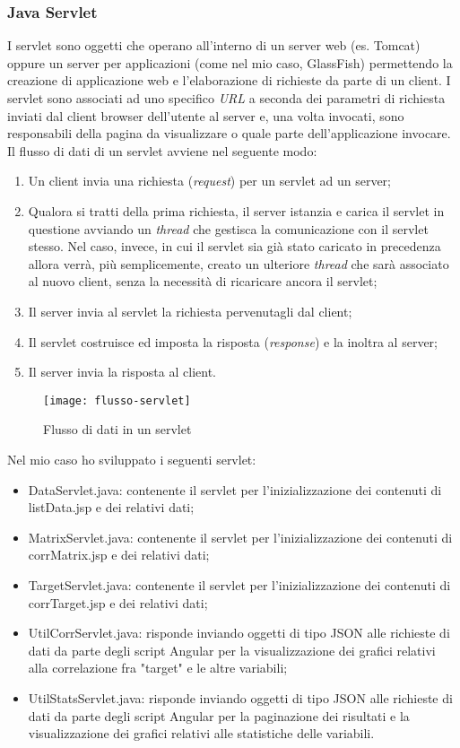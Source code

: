 \subsubsection{Java Servlet}
I servlet sono oggetti che operano all'interno di un server web (es. Tomcat) oppure un server per applicazioni (come nel mio caso, GlassFish) permettendo la creazione di applicazione web e l'elaborazione di richieste da parte di un client.
I servlet sono associati ad uno specifico \textit{URL} a seconda dei parametri di richiesta inviati dal client browser dell'utente al server e, una volta invocati, sono responsabili della pagina da visualizzare o quale parte dell'applicazione invocare.\\
Il flusso di dati di un servlet avviene nel seguente modo:
\begin{enumerate}
	\item Un client invia una richiesta (\textit{request}) per un servlet ad un server;
	\item Qualora si tratti della prima richiesta, il server istanzia e carica il servlet in questione avviando un \textit{thread} che gestisca la comunicazione con il servlet stesso. Nel caso, invece, in cui il servlet sia già stato caricato in precedenza allora verrà, più semplicemente, creato un ulteriore \textit{thread} che sarà associato al nuovo client, senza la necessità di ricaricare ancora il servlet;
	\item Il server invia al servlet la richiesta pervenutagli dal client;
	\item Il servlet costruisce ed imposta la risposta (\textit{response}) e la inoltra al server;
	\item Il server invia la risposta al client.
\end{enumerate}
\begin{figure}[!h]
	\centering
	\texttt{[image: flusso-servlet]}
	\caption{Flusso di dati in un servlet}
\end{figure}

Nel mio caso ho sviluppato i seguenti servlet:
\begin{itemize}
	\item DataServlet.java: contenente il servlet per l'inizializzazione  dei contenuti di listData.jsp e dei relativi dati;
	\item MatrixServlet.java: contenente il servlet per l'inizializzazione  dei contenuti di corrMatrix.jsp e dei relativi dati;
	\item TargetServlet.java: contenente il servlet per l'inizializzazione  dei contenuti di corrTarget.jsp e dei relativi dati;
	\item UtilCorrServlet.java: risponde inviando oggetti di tipo \gls{JSON} alle richieste di dati da parte degli script Angular per la visualizzazione dei grafici relativi alla correlazione fra "target" e le altre variabili;
	\item UtilStatsServlet.java: risponde inviando oggetti di tipo \gls{JSON} alle richieste di dati da parte degli script Angular per la paginazione dei risultati e la visualizzazione dei grafici relativi alle statistiche delle variabili.
\end{itemize}

